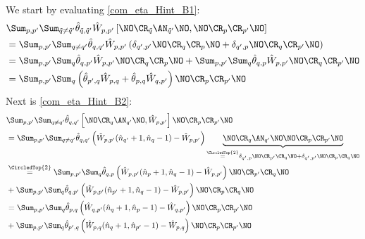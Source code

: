 \begin{appendix}
\begin{itemize}
\begin{subequations}
\begin{align}
\end{align}
\end{subequations}
We start by evaluating \ref{com_eta_Hint_B1}:
\begin{align}
&\Sum_{p, p^\prime}\Sum_{\tilde q\neq\tilde q^\prime} \hat\theta_{\tilde q,\tilde q^\prime}\hat W_{p,p^\prime}\left[\NO\CR_{\tilde q}\AN_{\tilde q^\prime}\NO,\NO\CR_p\CR_{p^\prime}\NO\right]\nonumber \\
&=\Sum_{p, p^\prime}\Sum_{q\neq q^\prime} \hat\theta_{ q, q^\prime}\hat W_{p,p^\prime}\left(\delta_{q^\prime,p^\prime}\NO\CR_q\CR_p\NO+\delta_{q^\prime,p}\NO\CR_q\CR_{p^\prime}\NO\right)\nonumber \\
&=\Sum_{p, p^\prime}\Sum_{q} \hat\theta_{ q, p^\prime}\hat W_{p,p^\prime}\NO\CR_q\CR_p\NO+\Sum_{p, p^\prime}\Sum_{q} \hat\theta_{ q, p}\hat W_{p,p^\prime}\NO\CR_q\CR_{p^\prime}\NO\nonumber \\
&=\Sum_{p, p^\prime}\Sum_{q}\left(\hat\theta_{ p^\prime, q}\hat W_{p,q}+\hat\theta_{ p,q}\hat W_{q,p^\prime}\right)\NO\CR_p\CR_{p^\prime}\NO
\end{align}
Next is \ref{com_eta_Hint_B2}:
\begin{align}
&\Sum_{p, p^\prime}\Sum_{ q\neq q^\prime} \hat\theta_{ q, q^\prime}\left[\NO\CR_{ q}\AN_{ q^\prime}\NO,\hat W_{p,p^\prime}\right]\NO\CR_p\CR_{p^\prime}\NO\nonumber \\
&= \Sum_{p, p^\prime}\Sum_{ q\neq q^\prime} \hat\theta_{ q, q^\prime}\left(\hat W_{p,p^\prime}(\hat n_{q^\prime}+1,\hat n_q-1)- \hat W_{p,p^\prime}\right)\underbrace{\NO\CR_{ q}\AN_{ q^\prime}\NO\NO\CR_p\CR_{p^\prime}\NO}_{\overset{\CircledTop{2}}{=}\delta_{q^\prime,p}\NO\CR_{p^\prime}\CR_q\NO+\delta_{q^\prime,p^\prime}\NO\CR_p\CR_q\NO}\nonumber \\
&\overset{\CircledTop{2}}{=} \Sum_{p, p^\prime}\Sum_{ q} \hat\theta_{ q, p}\left(\hat W_{p,p^\prime}(\hat n_{p}+1,\hat n_q-1)- \hat W_{p,p^\prime}\right)\NO\CR_{p^\prime}\CR_q\NO\nonumber \\
&+\Sum_{p, p^\prime}\Sum_{ q} \hat\theta_{ q, p^\prime}\left(\hat W_{p,p^\prime}(\hat n_{p^\prime}+1,\hat n_q-1)- \hat W_{p,p^\prime}\right)\NO\CR_p\CR_q\NO\nonumber \\
&= \Sum_{p, p^\prime}\Sum_{ q} \hat\theta_{ p,q}\left(\hat W_{q,p^\prime}(\hat n_{q}+1,\hat n_p-1)- \hat W_{q,p^\prime}\right)\NO\CR_p\CR_{p^\prime}\NO\nonumber \\
&+\Sum_{p, p^\prime}\Sum_{ q} \hat\theta_{ p^\prime,q}\left(\hat W_{p,q}(\hat n_{q}+1,\hat n_{p^\prime}-1)- \hat W_{p,q}\right)\NO\CR_p\CR_{p^\prime}\NO
\end{align}

\end{itemize}
\end{appendix}
